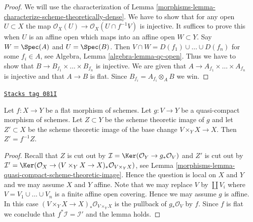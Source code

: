 \begin{proof}

We will use the characterization of
Lemma \ref{morphisms-lemma-characterize-scheme-theoretically-dense}.
We have to show that for any open $U \subset X$ the map
$\mathcal{O}_X(U) \to \mathcal{O}_X(U \cap f^{-1}V)$ is injective.
It suffices to prove this when $U$ is an affine open which maps into
an affine open $W \subset Y$. Say $W = \Spec(A)$ and $U = \Spec(B)$.
Then $V \cap W = D(f_1) \cup \ldots \cup D(f_n)$ for some
$f_i \in A$, see
Algebra, Lemma \ref{algebra-lemma-qc-open}.
Thus we have to show that
$B \to B_{f_1} \times \ldots \times B_{f_n}$ is injective.
We are given that $A \to A_{f_1} \times \ldots \times A_{f_n}$ is injective
and that $A \to B$ is flat. Since $B_{f_i} = A_{f_i} \otimes_A B$ we win.
\end{proof}

\begin{lemma}
\label{morphisms-lemma-flat-base-change-scheme-theoretic-image}
\href{https://stacks.math.columbia.edu/tag/081I}{\texttt{Stacks tag 081I}}


Let $f : X \to Y$ be a flat morphism of schemes. Let $g : V \to Y$ be a
quasi-compact morphism of schemes. Let $Z \subset Y$ be the scheme theoretic
image of $g$ and let $Z' \subset X$ be the scheme theoretic image of the
base change $V \times_Y X \to X$. Then $Z' = f^{-1}Z$.
\end{lemma}

\begin{proof}

Recall that $Z$ is cut out by
$\mathcal{I} = \Ker(\mathcal{O}_Y \to g_*\mathcal{O}_V)$
and $Z'$ is cut out by
$\mathcal{I}' = \Ker(\mathcal{O}_X \to
(V \times_Y X \to X)_*\mathcal{O}_{V \times_Y X})$, see
Lemma \ref{morphisms-lemma-quasi-compact-scheme-theoretic-image}.
Hence the question is local on $X$ and $Y$ and we may assume $X$ and $Y$
affine. Note that we may replace $V$ by $\coprod V_i$ where
$V = V_1 \cup \ldots \cup V_n$ is a finite affine open covering.
Hence we may assume $g$ is affine. In this case
$(V \times_Y X \to X)_*\mathcal{O}_{V \times_Y X}$ is the pullback
of $g_*\mathcal{O}_V$ by $f$. Since $f$ is flat we conclude that
$f^*\mathcal{I} = \mathcal{I}'$ and the lemma holds.
\end{proof}

